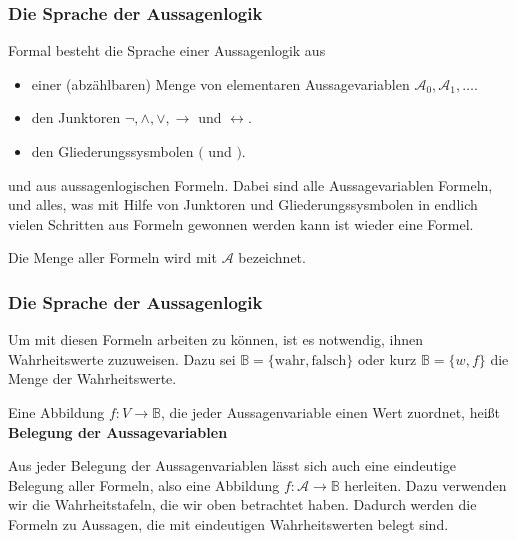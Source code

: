 \documentclass[hyperref={pdfpagelabels=false}]{beamer}
\theoremstyle{plain}%
\theoremstyle{definition}
\theoremstyle{remark}
\begin{document}
\begin{frame}
\frametitle{Die Sprache der Aussagenlogik}

Formal besteht die Sprache einer Aussagenlogik aus 
\begin{itemize}
\item<2-> einer (abzählbaren) Menge von elementaren Aussagevariablen $\mathscr{A}_0, \mathscr{A}_1, \ldots$.
\item<3-> den Junktoren $\neg, \wedge, \vee, \rightarrow$ und $\leftrightarrow$.
\item<4-> den Gliederungssysmbolen $($ und $)$.
\end{itemize}
\pause \pause \pause \pause
und aus aussagenlogischen Formeln. Dabei sind alle Aussagevariablen Formeln, und alles, was mit Hilfe von Junktoren 
und Gliederungssysmbolen in endlich vielen Schritten aus Formeln gewonnen werden kann ist wieder eine Formel. 

\pause 

Die Menge aller Formeln wird mit $\mathcal{A}$ bezeichnet.
\end{frame}

\begin{frame}
\frametitle{Die Sprache der Aussagenlogik}

Um mit diesen Formeln arbeiten zu können, ist es notwendig, ihnen Wahrheitswerte zuzuweisen. Dazu sei 
$\mathbb B  = \{ \mathrm{wahr}, \mathrm{falsch} \}$ oder kurz $\mathbb B = \{w, f\}$ die Menge der 
Wahrheitswerte. 

\pause 

\begin{definition} Eine Abbildung $f: V \longrightarrow \mathbb B$, die jeder Aussagenvariable einen Wert 
zuordnet, heißt \textbf{Belegung der Aussagevariablen} 
\end{definition}

\pause 

Aus jeder Belegung der Aussagenvariablen lässt sich auch eine eindeutige Belegung aller Formeln, also eine 
Abbildung $f: \mathcal{A} \longrightarrow \mathbb B$ herleiten. Dazu verwenden wir die Wahrheitstafeln, die
wir oben betrachtet haben. Dadurch werden die Formeln zu Aussagen, 
die mit eindeutigen Wahrheitswerten belegt sind. 

\end{frame}
\end{document}
